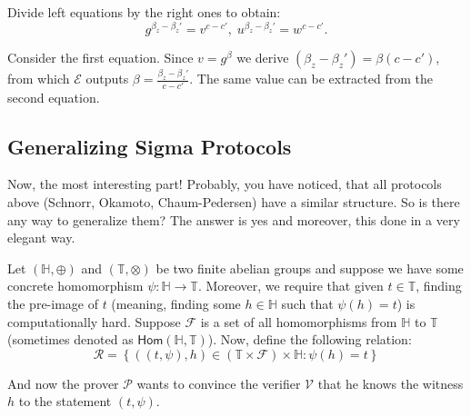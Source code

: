 \documentclass[../lecture-notes-105x135.tex]{subfiles}
\begin{document}
Divide left equations by the right ones to obtain:
\begin{equation*}
    g^{\beta_z - \beta_z'} = v^{c-c'}, \; u^{\beta_z - \beta_z'} = w^{c-c'}.
\end{equation*}

Consider the first equation. Since $v=g^{\beta}$ we derive $(\beta_z-\beta_z') = \beta(c-c')$, from which $\mathcal{E}$ outputs $\beta = \frac{\beta_z-\beta_z'}{c-c'}$. The same value can be extracted from the second equation.

\subsection{Generalizing Sigma Protocols}

Now, the most interesting part! Probably, you have noticed, that all protocols above (Schnorr, Okamoto, Chaum-Pedersen) have a similar structure. So is there any way to generalize them? The answer is yes and moreover, this done in a very elegant way.

Let $(\mathbb{H}, \oplus)$ and $(\mathbb{T}, \otimes)$ be two finite abelian groups and suppose we have some concrete homomorphism $\psi: \mathbb{H} \to \mathbb{T}$. Moreover, we require that given $t \in \mathbb{T}$, finding the pre-image of $t$ (meaning, finding some $h \in \mathbb{H}$ such that $\psi(h)=t$) is computationally hard. Suppose $\mathcal{F}$ is a set of all homomorphisms from $\mathbb{H}$ to $\mathbb{T}$ (sometimes denoted as $\mathsf{Hom}(\mathbb{H}, \mathbb{T})$). Now, define the following relation:
\begin{equation*}
    \mathcal{R} = \left\{ ((t,\psi), h) \in (\mathbb{T} \times \mathcal{F}) \times \mathbb{H}: \psi(h) = t \right\}
\end{equation*}

And now the prover $\mathcal{P}$ wants to convince the verifier $\mathcal{V}$ that he knows the witness $h$ to the statement $(t,\psi)$. 

\vspace{-1mm}
\end{document}
